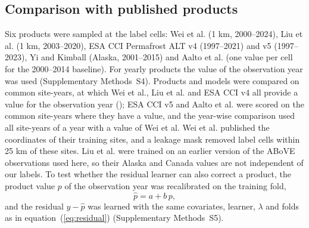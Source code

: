 \subsection{Comparison with published products}
Six products were sampled at the label cells: Wei et al.\cite{Wei2026} (1 km, 2000--2024), Liu et al.\cite{Liu2024} (1 km, 2003--2020), ESA CCI Permafrost ALT v4 (1997--2021) and v5 (1997--2023)\cite{Westermann2024,Westermann2025}, Yi and Kimball\cite{YiKimball2019} (Alaska, 2001--2015) and Aalto et al.\cite{Aalto2018} (one value per cell for the 2000--2014 baseline). For yearly products the value of the observation year was used (Supplementary Methods~S4). Products and models were compared on common site-years, at which Wei et al., Liu et al. and ESA CCI v4 all provide a value for the observation year (\nyrscc); ESA CCI v5 and Aalto et al. were scored on the common site-years where they have a value, and the year-wise comparison used all site-years of a year with a value of Wei et al. Wei et al. published the coordinates of their training sites, and a leakage mask removed label cells within 25 km of these sites. Liu et al. were trained on an earlier version of the ABoVE observations used here\cite{Liu2024}, so their Alaska and Canada values are not independent of our labels. To test whether the residual learner can also correct a product, the product value $p$ of the observation year was recalibrated on the training fold,
\begin{equation}
\hat{p} = a + b\, p,
\label{eq:prod}
\end{equation}
and the residual $y-\hat{p}$ was learned with the same covariates, learner, $\lambda$ and folds as in equation~(\ref{eq:residual}) (Supplementary Methods~S5).

